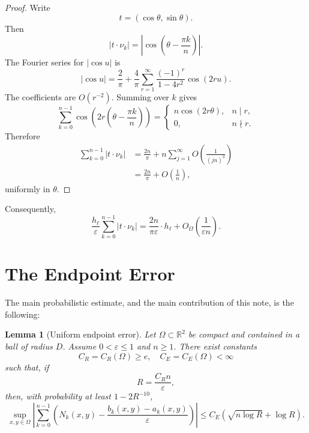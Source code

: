 \documentclass[11pt]{article}
\newtheorem{lemma}[theorem]{Lemma}
\newcommand{\R}{\mathbb R}
\newcommand{\eps}{\varepsilon}
\begin{document}
\begin{proof}
Write
\[
        t=(\cos\theta,\sin\theta).
\]
Then
\[
        |t\cdot\nu_k|
        =
        \left|
        \cos\left(\theta-\frac{\pi k}{n}\right)
        \right|.
\]
The Fourier series for $|\cos u|$ is
\[
        |\cos u|
        =
        \frac2\pi
        +
        \frac4\pi
        \sum_{r=1}^\infty
        \frac{(-1)^r}{1-4r^2}\cos(2ru).
\]
The coefficients are $O(r^{-2})$. Summing over $k$ gives
\[
        \sum_{k=0}^{n-1}
        \cos\left(2r\left(\theta-\frac{\pi k}{n}\right)\right)
        =
        \begin{cases}
        n\cos(2r\theta), & n\mid r,\\
        0, & n\nmid r.
        \end{cases}
\]
Therefore
\[
\begin{aligned}
        \sum_{k=0}^{n-1}|t\cdot\nu_k|
        &=
        \frac{2n}{\pi}
        +
        n\sum_{j=1}^{\infty}O\left(\frac1{(jn)^2}\right)  \\
        &=
        \frac{2n}{\pi}+O\left(\frac1n\right),
\end{aligned}
\]
uniformly in $\theta$.
\end{proof}

\bigskip
\noindent
Consequently,
\[
        \frac{h_\ell}{\eps}
        \sum_{k=0}^{n-1}|t\cdot\nu_k|
        =
        \frac{2n}{\pi\eps}\cdot h_\ell
        +
        O_\Omega\left(\frac1{\eps n}\right).
\]

\section{The Endpoint Error}

The main probabilistic estimate, and the main contribution of this note, is the following:

\begin{lemma}[Uniform endpoint error]\label{lem:endpoint}
Let $\Omega\subset\R^2$ be compact and contained in a ball of radius $D$. Assume $0<\eps\le1$ and $n\ge1$. There exist constants
\[
        C_R=C_R(\Omega)\ge e,
        \quad
        C_E=C_E(\Omega)<\infty
\]
such that, if
\[
        R=\frac{C_R n}{\eps},
\]
then, with probability at least $1-2R^{-10}$,
\[
        \sup_{x,y\in\Omega}
        \left|
        \sum_{k=0}^{n-1}
        \left(
        N_k(x,y)
        -
        \frac{b_k(x,y)-a_k(x,y)}{\eps}
        \right)
        \right|
        \le
        C_E
        \left(
        \sqrt{n\log R}+\log R
        \right).
\]
\end{lemma}
\end{document}
